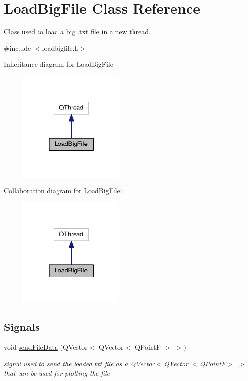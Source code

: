 \hypertarget{classLoadBigFile}{}\section{Load\+Big\+File Class Reference}
\label{classLoadBigFile}


Class used to load a big .txt file in a new thread.  




{\ttfamily \#include $<$loadbigfile.\+h$>$}



Inheritance diagram for Load\+Big\+File\+:\nopagebreak
\begin{figure}[H]
\begin{center}
\leavevmode
\includegraphics[width=148pt]{classLoadBigFile__inherit__graph}
\end{center}
\end{figure}


Collaboration diagram for Load\+Big\+File\+:\nopagebreak
\begin{figure}[H]
\begin{center}
\leavevmode
\includegraphics[width=148pt]{classLoadBigFile__coll__graph}
\end{center}
\end{figure}
\subsection*{Signals}
\begin{DoxyCompactItemize}
\item 
void \hyperlink{classLoadBigFile_ad0c00cd9faeeb4e03a94f530152c69d9}{send\+File\+Data} (Q\+Vector$<$ Q\+Vector$<$ Q\+PointF $>$ $>$)
\begin{DoxyCompactList}\small\item\em signal used to send the loaded txt file as a Q\+Vector$<$Q\+Vector $<$\+Q\+Point\+F$>$ $>$ that can be used for plotting the file \end{DoxyCompactList}\end{DoxyCompactItemize}
